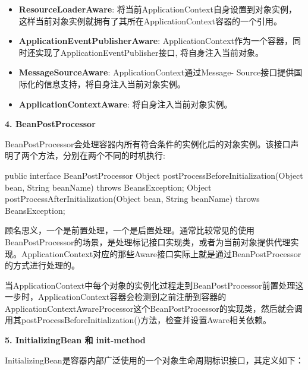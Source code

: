 \begin{itemize}
    \item \textbf{ResourceLoaderAware}: 将当前ApplicationContext自身设置到对象实例，这样当前对象实例就拥有了其所在ApplicationContext容器的一个引用。
    \item \textbf{ApplicationEventPublisherAware}: ApplicationContext作为一个容器，同时还实现了ApplicationEventPublisher接口, 将自身注入当前对象。
    \item \textbf{MessageSourceAware}: ApplicationContext通过Message- Source接口提供国际化的信息支持，将自身注入当前对象实例。
    \item \textbf{ApplicationContextAware}: 将自身注入当前对象实例。
\end{itemize}

\noindent\textbf{4. BeanPostProcessor}


BeanPostProcessor会处理容器内所有符合条件的实例化后的对象实例。该接口声明了两个方法，分别在两个不同的时机执行:

\begin{Java}
public interface BeanPostProcessor {
    Object postProcessBeforeInitialization(Object bean, String beanName) throws BeansException;  
    Object postProcessAfterInitialization(Object bean, String beanName) throws BeansException;  
}
\end{Java}

顾名思义，一个是前置处理，一个是后置处理。通常比较常见的使用BeanPostProcessor的场景，是处理标记接口实现类，或者为当前对象提供代理实现。ApplicationContext对应的那些Aware接口实际上就是通过BeanPostProcessor的方式进行处理的。

当ApplicationContext中每个对象的实例化过程走到BeanPostProcessor前置处理这一步时，ApplicationContext容器会检测到之前注册到容器的ApplicationContextAwareProcessor这个BeanPostProcessor的实现类，然后就会调用其postProcessBeforeInitialization()方法，检查并设置Aware相关依赖。

\noindent\textbf{5. InitializingBean 和 init-method}

InitializingBean是容器内部广泛使用的一个对象生命周期标识接口，其定义如下：

